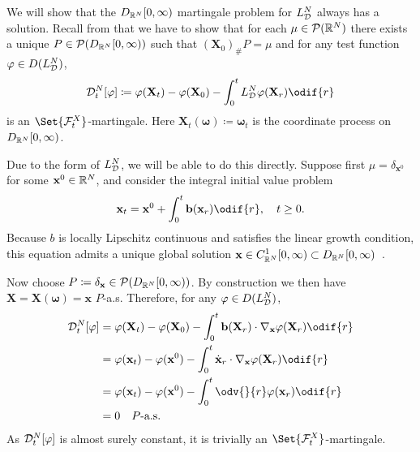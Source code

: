 We will show that the \(D_{\mathbb{R}^N}[0,\infty)\) martingale problem for \(L_{\mathcal{D}}^N\) always has a solution.
Recall from  that we have to show that for each \(\mu \in \mathcal{P}(\mathbb{R}^N)\) there exists a unique \(P \in \mathcal{P}(D_{\mathbb{R}^N}[0,\infty))\) such that \( (\bm{X}_0)_\# P = \mu \) and for any test function \(\varphi \in D(L_{\mathcal{D}}^N)\),
\begin{equation}
  \cD_t^{N}[\varphi]
  \coloneqq \varphi(\bm{X}_t) - \varphi(\bm{X}_0) - \int_0^t L_{\cD}^{N} \varphi(\bm{X}_r) \odif{r}
\end{equation}
is an \(\Set{\cF_t^X}\)-martingale.
Here \(\bm{X}_t(\bm{\omega}) \coloneqq \bm{\omega}_t\) is the coordinate process on \(D_{\mathbb{R}^N}[0,\infty)\).

Due to the form of \(L_{\mathcal{D}}^N\), we will be able to do this directly.
Suppose first \(\mu = \delta_{\bm{x}^0}\) for some \(\mathbf{x}^0 \in \mathbb{R}^N\), and consider the integral initial value problem
\begin{equation}
  \bm{x}_t = \bm{x}^0 + \int_0^t \bm{b}(\bm{x}_r) \odif{r}, \quad t \geq 0.
\end{equation}
Because \(b\) is locally Lipschitz continuous and satisfies the linear growth condition, this equation admits a unique global solution \(\mathbf{x} \in C^1_{\mathbb{R}^N}[0,\infty) \subset D_{\mathbb{R}^N}[0,\infty)\)~\cite{ode_result}.

Now choose \(P \coloneqq \delta_{\mathbf{x}} \in \mathcal{P}(D_{\mathbb{R}^N}[0,\infty))\).
By construction we then have \(\bm{X} = \bm{X}(\bm{\omega}) = \bm{x}\) \(P\)-a.s.
Therefore, for any \(\varphi \in D(L_{\mathcal{D}}^N)\),
\begin{equation}
  \begin{split}
    \cD_t^{N}[\varphi] & = \varphi(\bm{X}_t) - \varphi(\bm{X}_0) - \int_0^t \bm{b}(\bm{X}_r) \cdot \nabla_{\bm{x}} \varphi(\bm{X}_r) \odif{r} \\
                       & = \varphi(\bm{x}_t) - \varphi(\bm{x}^0) - \int_0^t \dot{\bm{x}}_r \cdot \nabla_{\bm{x}} \varphi(\bm{X}_r) \odif{r}   \\
                       & = \varphi(\bm{x}_t) - \varphi(\bm{x}^0) - \int_0^t \odv{}{r} \varphi(\bm{x}_r) \odif{r}                              \\
                       & = 0 \quad P\text{-a.s.}
  \end{split}
\end{equation}
As \(\mathcal{D}_t^{N}[\varphi]\) is almost surely constant, it is trivially an \(\Set{\cF_t^X}\)-martingale.


